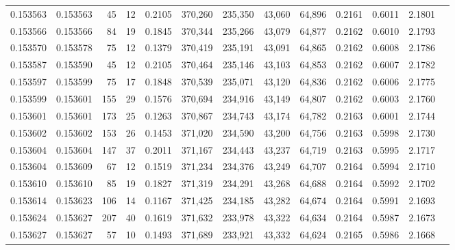 \begin{tabular}{rrrrrrrrrrrrr}
0.153563 & 0.153563 &    45 &  12 &                                     0.2105 & 370,260 & 235,350 &  43,060 &  64,896 & 0.2161 & 0.6011 & 2.1801 \\
0.153566 & 0.153566 &    84 &  19 &                                     0.1845 & 370,344 & 235,266 &  43,079 &  64,877 & 0.2162 & 0.6010 & 2.1793 \\
0.153570 & 0.153578 &    75 &  12 &                                     0.1379 & 370,419 & 235,191 &  43,091 &  64,865 & 0.2162 & 0.6008 & 2.1786 \\
0.153587 & 0.153590 &    45 &  12 &                                     0.2105 & 370,464 & 235,146 &  43,103 &  64,853 & 0.2162 & 0.6007 & 2.1782 \\
0.153597 & 0.153599 &    75 &  17 &                                     0.1848 & 370,539 & 235,071 &  43,120 &  64,836 & 0.2162 & 0.6006 & 2.1775 \\
0.153599 & 0.153601 &   155 &  29 &                                     0.1576 & 370,694 & 234,916 &  43,149 &  64,807 & 0.2162 & 0.6003 & 2.1760 \\
0.153601 & 0.153601 &   173 &  25 &                                     0.1263 & 370,867 & 234,743 &  43,174 &  64,782 & 0.2163 & 0.6001 & 2.1744 \\
0.153602 & 0.153602 &   153 &  26 &                                     0.1453 & 371,020 & 234,590 &  43,200 &  64,756 & 0.2163 & 0.5998 & 2.1730 \\
0.153604 & 0.153604 &   147 &  37 &                                     0.2011 & 371,167 & 234,443 &  43,237 &  64,719 & 0.2163 & 0.5995 & 2.1717 \\
0.153604 & 0.153609 &    67 &  12 &                                     0.1519 & 371,234 & 234,376 &  43,249 &  64,707 & 0.2164 & 0.5994 & 2.1710 \\
0.153610 & 0.153610 &    85 &  19 &                                     0.1827 & 371,319 & 234,291 &  43,268 &  64,688 & 0.2164 & 0.5992 & 2.1702 \\
0.153614 & 0.153623 &   106 &  14 &                                     0.1167 & 371,425 & 234,185 &  43,282 &  64,674 & 0.2164 & 0.5991 & 2.1693 \\
0.153624 & 0.153627 &   207 &  40 &                                     0.1619 & 371,632 & 233,978 &  43,322 &  64,634 & 0.2164 & 0.5987 & 2.1673 \\
0.153627 & 0.153627 &    57 &  10 &                                     0.1493 & 371,689 & 233,921 &  43,332 &  64,624 & 0.2165 & 0.5986 & 2.1668 \\

\end{tabular}
